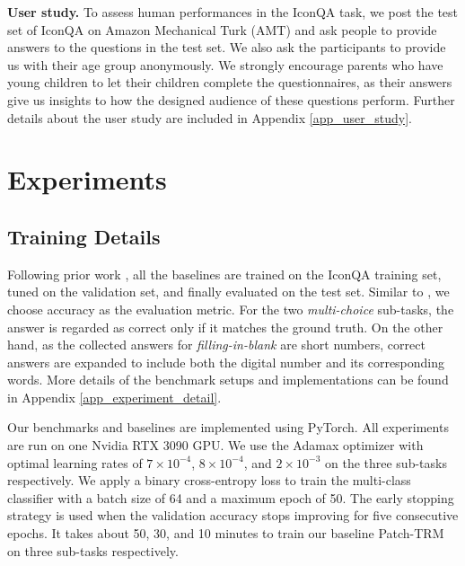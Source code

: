\documentclass{article}
\begin{document}
\textbf{User study.} To assess human performances in the IconQA task, we post the test set of IconQA on Amazon Mechanical Turk (AMT) and ask people to provide answers to the questions in the test set. We also ask the participants to provide us with their age group anonymously. We strongly encourage parents who have young children to let their children complete the questionnaires, as their answers give us insights to how the designed audience of these questions perform. Further details about the user study are included in Appendix \ref{app_user_study}.






\section{Experiments}







\subsection{Training Details}
\label{sec:implementation}

Following prior work \cite{antol2015vqa}, all the baselines are trained on the IconQA training set, tuned on the validation set, and finally evaluated on the test set. Similar to \cite{antol2015vqa}, we choose accuracy as the evaluation metric. For the two \textit{multi-choice} sub-tasks, the answer is regarded as correct only if it matches the ground truth. On the other hand, as the collected answers for \textit{filling-in-blank} are short numbers, correct answers are expanded to include both the digital number and its corresponding words. More details of the benchmark setups and implementations can be found in Appendix \ref{app_experiment_detail}.

Our benchmarks and baselines are implemented using PyTorch. All experiments are run on one Nvidia RTX 3090 GPU. We use the Adamax optimizer with optimal learning rates of $7\times 10^{-4}$, $8 \times 10^{-4}$, and $2 \times 10^{-3}$ on the three sub-tasks respectively. We apply a binary cross-entropy loss to train the multi-class classifier with a batch size of 64 and a maximum epoch of 50. The early stopping strategy is used when the validation accuracy stops improving for five consecutive epochs. It takes about 50, 30, and 10 minutes to train our baseline Patch-TRM on three sub-tasks respectively.
\end{document}

